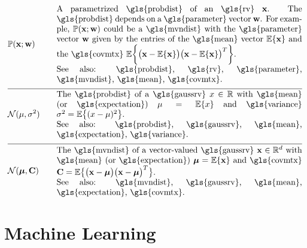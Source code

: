 \begin{align} 
	&\prob{\featurevec;\weights} &\quad & \parbox{.85\textwidth}{A parametrized \gls{probdist} of an \gls{rv} $\featurevec$. 
		The \gls{probdist} depends on a \gls{parameter} vector $\weights$. For example, $\prob{\featurevec;\weights}$ could be a 
		\gls{mvndist} with the \gls{parameter} vector $\weights$ given by the entries of the \gls{mean} vector $\expect \{ \featurevec \}$ 
		and the \gls{covmtx} $\expect \bigg \{ \big( \featurevec - \expect \{ \featurevec \}\big) \big( \featurevec - \expect \{ \featurevec \}\big)^{T}  \bigg\}$.
		\\ See also: \gls{probdist}, \gls{rv}, \gls{parameter}, \gls{mvndist}, \gls{mean}, \gls{covmtx}.} \nonumber \\[2mm] \hline \nonumber\\[-5mm]
	&\mathcal{N}(\mu, \sigma^{2}) &\quad & \parbox{.85\textwidth}{The \gls{probdist} of a 
		\gls{gaussrv} $\feature \in \mathbb{R}$ with \gls{mean} (or \gls{expectation}) $\mu= \expect \{ \feature \}$ 
		and \gls{variance} $\sigma^{2} =   \expect \big\{  (  \feature - \mu )^2 \big\}$.
		\\ See also: \gls{probdist}, \gls{gaussrv}, \gls{mean}, \gls{expectation}, \gls{variance}.} \nonumber \\[2mm] \hline \nonumber\\[-5mm]
	&\mathcal{N}(\meanvecgeneric, \mathbf{C}) &\quad & \parbox{.85\textwidth}{The \gls{mvndist} of a vector-valued 
		\gls{gaussrv} $\featurevec \in \mathbb{R}^{\featuredim}$ with \gls{mean} (or \gls{expectation}) $\clustermean= \expect \{ \featurevec \}$ 
		and \gls{covmtx} $\mathbf{C} =  \expect \big\{ \big( \featurevec - \clustermean \big)\big( \featurevec - \clustermean \big)^{T} \big\}$.
		\\ See also: \gls{mvndist}, \gls{gaussrv}, \gls{mean}, \gls{expectation}, \gls{covmtx}.} \nonumber                                             
\end{align}





\newpage
\section*{Machine Learning}

